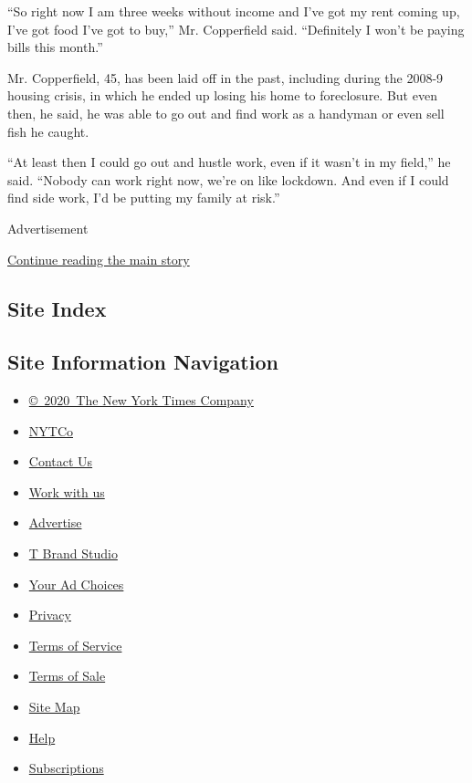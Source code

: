 ``So right now I am three weeks without income and I've got my rent
coming up, I've got food I've got to buy,'' Mr. Copperfield said.
``Definitely I won't be paying bills this month.''

Mr. Copperfield, 45, has been laid off in the past, including during the
2008-9 housing crisis, in which he ended up losing his home to
foreclosure. But even then, he said, he was able to go out and find work
as a handyman or even sell fish he caught.

``At least then I could go out and hustle work, even if it wasn't in my
field,'' he said. ``Nobody can work right now, we're on like lockdown.
And even if I could find side work, I'd be putting my family at risk.''

Advertisement

\protect\hyperlink{after-bottom}{Continue reading the main story}

\hypertarget{site-index}{%
\subsection{Site Index}\label{site-index}}

\hypertarget{site-information-navigation}{%
\subsection{Site Information
Navigation}\label{site-information-navigation}}

\begin{itemize}
\tightlist
\item
  \href{https://help.nytimes.com/hc/en-us/articles/115014792127-Copyright-notice}{©~2020~The
  New York Times Company}
\end{itemize}

\begin{itemize}
\tightlist
\item
  \href{https://www.nytco.com/}{NYTCo}
\item
  \href{https://help.nytimes.com/hc/en-us/articles/115015385887-Contact-Us}{Contact
  Us}
\item
  \href{https://www.nytco.com/careers/}{Work with us}
\item
  \href{https://nytmediakit.com/}{Advertise}
\item
  \href{http://www.tbrandstudio.com/}{T Brand Studio}
\item
  \href{https://www.nytimes.com/privacy/cookie-policy\#how-do-i-manage-trackers}{Your
  Ad Choices}
\item
  \href{https://www.nytimes.com/privacy}{Privacy}
\item
  \href{https://help.nytimes.com/hc/en-us/articles/115014893428-Terms-of-service}{Terms
  of Service}
\item
  \href{https://help.nytimes.com/hc/en-us/articles/115014893968-Terms-of-sale}{Terms
  of Sale}
\item
  \href{https://spiderbites.nytimes.com}{Site Map}
\item
  \href{https://help.nytimes.com/hc/en-us}{Help}
\item
  \href{https://www.nytimes.com/subscription?campaignId=37WXW}{Subscriptions}
\end{itemize}
